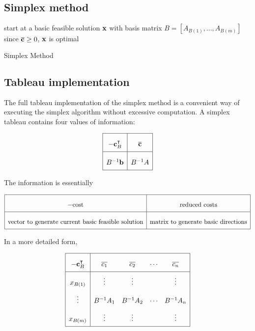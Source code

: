 \subsection{Simplex method}
\begin{algorithm*}[H]
	\SetAlgoLined{}
	start at a basic feasible solution \(\vb x\) with basis matrix \(B = [A_{B(1)}, \dots, A_{B(m)}]\)\;
	since \( \overline{\vb c} \geq 0 \), \( \vb x \) is optimal
	\caption{Simplex Method}
\end{algorithm*}

\subsection{Tableau implementation}
The full tableau implementation of the simplex method is a convenient way of executing the simplex algorithm without excessive computation.
A simplex tableau contains four values of information:

\[
	\arraycolsep=5pt\def\arraystretch{2.2}
	\begin{array}{|c|c|}\hline
		-\vb c_B^\transpose & \overline{\vb c} \\\hline
		B^{-1}\vb b         & B^{-1}A          \\\hline
	\end{array}
\]

The information is essentially

\[
	\arraycolsep=5pt\def\arraystretch{2.2}
	\begin{array}{|c|c|}
		\hline
		-\text{cost}                                              & \text{reduced costs}                       \\\hline
		\text{vector to generate current basic feasible solution} & \text{matrix to generate basic directions} \\\hline
	\end{array}
\]

In a more detailed form,

\[
	\arraycolsep=5pt\def\arraystretch{2.2}
	\begin{array}{|c|cccc|}\hline
		-\vb c_B^\transpose & \overline{c_1} & \overline{c_2} & \cdots & \overline{c_n} \\\hline
		x_{B(1)}            & \vdots         & \vdots         &        & \vdots         \\
		\vdots              & B^{-1} A_1     & B^{-1} A_2     & \cdots & B^{-1} A_n     \\
		x_{B(m)}            & \vdots         & \vdots         &        & \vdots         \\\hline
	\end{array}
\]

